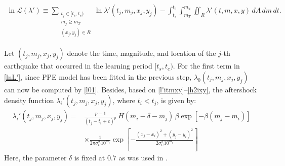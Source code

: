 \documentclass[extra,mreferee]{gji}
\theoremstyle{lemma}
\begin{document}
\begin{equation}\label{lnL'}
\begin{aligned}
\ln{\mathcal{L}(\lambda')} \equiv \sum_{\substack{t_j \in [t_s,t_e)\\ m_j \ge m_T\\ (x_j,y_j) \in R}} \!\! \ln{\lambda'(t_j,m_j,x_j,y_j)} 
- \int_{t_s}^{t_e} \int_{m_T}^{m_u} \iint_{R} \lambda'(t,m,x,y)\, dA\, dm\, dt.
\end{aligned}
\end{equation}

Let $(t_j, m_j, x_j, y_j)$ denote the time, magnitude, and location of the $j$-th earthquake that occurred in the learning period $[t_s,t_e)$. For the first term in \eqref{lnL'}, since PPE model has been fitted in the previous step, $\lambda_0(t_j, m_j, x_j, y_j)$ can now be computed by \eqref{l01}. Besides, based on \eqref{l'itmxy}--\eqref{h2ixy}, the aftershock density function $\lambda_i'(t_j, m_j, x_j, y_j)$, where $t_i < t_j$, is given by:
\begin{equation*}
\begin{aligned}
\lambda_i'(t_j, m_j, x_j, y_j) ={} & \frac{p - 1}{(t_j - t_i + c)^p} \, H(m_i - \delta - m_j)\, \beta \exp\!\left[ -\beta(m_j - m_i) \right] \\
& \times \frac{1}{2\pi \sigma_U^2 10^{m_i}} \exp\!\left[ -\frac{(x_j - x_i)^2 + (y_j - y_i)^2}{2 \sigma_U^2 10^{m_i}} \right]
\end{aligned}
\end{equation*}
Here, the parameter $\delta$ is fixed at $0.7$ as was used in \cite{2023ER,RE}.  
\end{document}
